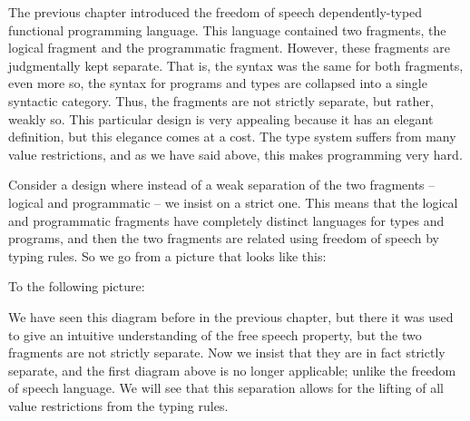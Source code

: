 


\renewcommand{\Sepdrulename}[1]{\scriptsize \textsc{#1}}
\renewcommand{\SepUdrulename}[1]{\scriptsize \textsc{#1}}

The previous chapter introduced the freedom of speech
dependently-typed functional programming language. This language
contained two fragments, the logical fragment and the programmatic
fragment.  However, these fragments are judgmentally kept separate.
That is, the syntax was the same for both fragments, even more so, the
syntax for programs and types are collapsed into a single syntactic
category.  Thus, the fragments are not strictly separate, but rather,
weakly so.  This particular design is very appealing because it has an
elegant definition, but this elegance comes at a cost.  The type
system suffers from many value restrictions, and as we have said
above, this makes programming very hard.

Consider a design where instead of a weak separation of the two
fragments -- logical and programmatic -- we insist on a strict one.
This means that the logical and programmatic fragments
have completely distinct languages for types and programs, and then
the two fragments are related using freedom of speech by typing rules.
So we go from a picture that looks like this:
\begin{center}
\end{center}
To the following picture:
\begin{center}
\end{center}
We have seen this diagram before in the previous chapter, but there it
was used to give an intuitive understanding of the free speech
property, but the two fragments are not strictly separate.  Now we
insist that they are in fact strictly separate, and the first diagram
above is no longer applicable; unlike the freedom of speech language.  We
will see that this separation allows for the lifting of all value
restrictions from the typing rules.  

